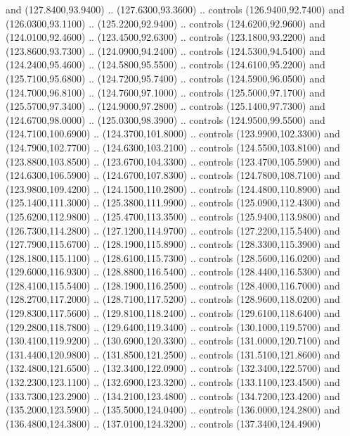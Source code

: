 {\begin{scope}[y=0.80pt, x=0.80pt, yscale=-1, xscale=1, inner sep=0pt, outer sep=0pt, #1]
      and (127.8400,93.9400) .. (127.6300,93.3600) .. controls (126.9400,92.7400)
      and (126.0300,93.1100) .. (125.2200,92.9400) .. controls (124.6200,92.9600)
      and (124.0100,92.4600) .. (123.4500,92.6300) .. controls (123.1800,93.2200)
      and (123.8600,93.7300) .. (124.0900,94.2400) .. controls (124.5300,94.5400)
      and (124.2400,95.4600) .. (124.5800,95.5500) .. controls (124.6100,95.2200)
      and (125.7100,95.6800) .. (124.7200,95.7400) .. controls (124.5900,96.0500)
      and (124.7000,96.8100) .. (124.7600,97.1000) .. controls (125.5000,97.1700)
      and (125.5700,97.3400) .. (124.9000,97.2800) .. controls (125.1400,97.7300)
      and (124.6700,98.0000) .. (125.0300,98.3900) .. controls (124.9500,99.5500)
      and (124.7100,100.6900) .. (124.3700,101.8000) .. controls (123.9900,102.3300)
      and (124.7900,102.7700) .. (124.6300,103.2100) .. controls (124.5500,103.8100)
      and (123.8800,103.8500) .. (123.6700,104.3300) .. controls (123.4700,105.5900)
      and (124.6300,106.5900) .. (124.6700,107.8300) .. controls (124.7800,108.7100)
      and (123.9800,109.4200) .. (124.1500,110.2800) .. controls (124.4800,110.8900)
      and (125.1400,111.3000) .. (125.3800,111.9900) .. controls (125.0900,112.4300)
      and (125.6200,112.9800) .. (125.4700,113.3500) .. controls (125.9400,113.9800)
      and (126.7300,114.2800) .. (127.1200,114.9700) .. controls (127.2200,115.5400)
      and (127.7900,115.6700) .. (128.1900,115.8900) .. controls (128.3300,115.3900)
      and (128.1800,115.1100) .. (128.6100,115.7300) .. controls (128.5600,116.0200)
      and (129.6000,116.9300) .. (128.8800,116.5400) .. controls (128.4400,116.5300)
      and (128.4100,115.5400) .. (128.1900,116.2500) .. controls (128.4000,116.7000)
      and (128.2700,117.2000) .. (128.7100,117.5200) .. controls (128.9600,118.0200)
      and (129.8300,117.5600) .. (129.8100,118.2400) .. controls (129.6100,118.6400)
      and (129.2800,118.7800) .. (129.6400,119.3400) .. controls (130.1000,119.5700)
      and (130.4100,119.9200) .. (130.6900,120.3300) .. controls (131.0000,120.7100)
      and (131.4400,120.9800) .. (131.8500,121.2500) .. controls (131.5100,121.8600)
      and (132.4800,121.6500) .. (132.3400,122.0900) .. controls (132.3400,122.5700)
      and (132.2300,123.1100) .. (132.6900,123.3200) .. controls (133.1100,123.4500)
      and (133.7300,123.2900) .. (134.2100,123.4800) .. controls (134.7200,123.4200)
      and (135.2000,123.5900) .. (135.5000,124.0400) .. controls (136.0000,124.2800)
      and (136.4800,124.3800) .. (137.0100,124.3200) .. controls (137.3400,124.4900)

\end{scope}}
